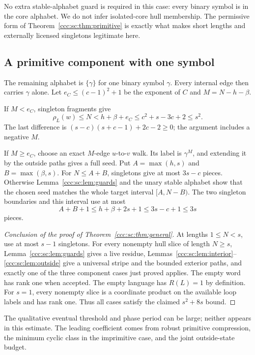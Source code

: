 \documentclass[11pt,letterpaper]{article}
\theoremstyle{definition}
\theoremstyle{remark}
\newcommand{\rank}{\rho}
\begin{document}
No extra stable-alphabet guard is required in this case: every binary symbol is in the core alphabet. We do not infer isolated-core hull membership. The permissive form of Theorem~\ref{ccc:sc:thm:primitive} is exactly what makes short lengths and externally licensed singletons legitimate here.

\subsection{A primitive component with one symbol}

The remaining alphabet is $\{\gamma\}$ for one binary symbol $\gamma$. Every internal edge then carries $\gamma$ alone. Let $e_C\le(c-1)^2+1$ be the exponent of $C$ and $M=N-h-\beta$.

If $M<e_C$, singleton fragments give
\[
 \rank_L(w)\le N<h+\beta+e_C
 \le c^2+s-3c+2\le s^2.
\]
The last difference is $(s-c)(s+c-1)+2c-2\ge0$; the argument includes a negative $M$.

If $M\ge e_C$, choose an exact $M$-edge $u$-to-$v$ walk. Its label is $\gamma^M$, and extending it by the outside paths gives a full seed. Put $A=\max(h,s)$ and $B=\max(\beta,s)$. For $N\le A+B$, singletons give at most $3s-c$ pieces. Otherwise Lemma~\ref{ccc:sc:lem:guards} and the unary stable alphabet show that the chosen seed matches the whole target interval $[A,N-B)$. The two singleton boundaries and this interval use at most
\[
 A+B+1\le h+\beta+2s+1\le3s-c+1\le3s
\]
pieces.

\begin{proof}[Conclusion of the proof of Theorem~\ref{ccc:sc:thm:general}]
At lengths $1\le N<s$, use at most $s-1$ singletons. For every nonempty hull slice of length $N\ge s$, Lemma~\ref{ccc:sc:lem:guards} gives a live residue, Lemmas~\ref{ccc:sc:lem:interior}--\ref{ccc:sc:lem:outside} give a universal stripe and the bounded exterior paths, and exactly one of the three component cases just proved applies. The empty word has rank one when accepted. The empty language has $R(L)=1$ by definition. For $s=1$, every nonempty slice is a coordinate product on the available loop labels and has rank one. Thus all cases satisfy the claimed $s^2+8s$ bound.
\end{proof}

The qualitative eventual threshold and phase period can be large; neither appears in this estimate. The leading coefficient comes from robust primitive compression, the minimum cyclic class in the imprimitive case, and the joint outside-state budget.
\end{document}
